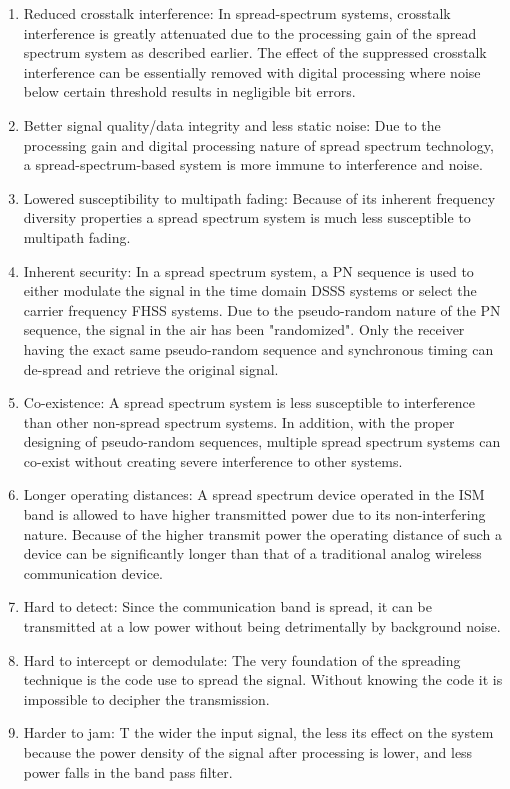 \documentclass[12pt, a4paper,twoside]{tesi_upf}
\begin{document}
\begin{enumerate}
	\item Reduced crosstalk interference: In spread-spectrum systems, crosstalk interference is greatly attenuated due to the processing gain of the spread spectrum system as described earlier. The effect of the suppressed crosstalk interference can be essentially removed with digital processing where noise below certain threshold results in negligible bit errors.
	\item Better signal quality/data integrity and less static noise: Due to the processing gain and digital processing nature of spread spectrum technology, a spread-spectrum-based system is more immune to interference and noise.
	\item Lowered susceptibility to multipath fading: Because of its inherent frequency diversity properties a spread spectrum system is much less susceptible to multipath fading.
	\item Inherent security: In a spread spectrum system, a PN sequence is used to either modulate the signal in the time domain DSSS systems or select the carrier frequency FHSS systems. Due to the pseudo-random nature of the PN sequence, the signal in the air has been "randomized". Only the receiver having the exact same pseudo-random sequence and synchronous timing can de-spread and retrieve the original signal.
	\item Co-existence: A spread spectrum system is less susceptible to interference than other non-spread spectrum systems. In addition, with the proper designing of pseudo-random sequences, multiple spread spectrum systems can co-exist without creating severe interference to other systems.
	\item Longer operating distances: A spread spectrum device operated in the ISM band is allowed to have higher transmitted power due to its non-interfering nature. Because of the higher transmit power the operating distance of such a device can be significantly longer than that of a traditional analog wireless communication device.
	\item Hard to detect: Since the communication band is spread, it can be transmitted at a low power without being detrimentally by background noise.
	\item Hard to intercept or demodulate: The very foundation of the spreading technique is the code use to spread the signal. Without knowing the code it is impossible to decipher the transmission.
	\item Harder to jam: T the wider the input signal, the less its effect on the system because the power density of the signal after processing is lower, and less power falls in the band pass filter.
\end{enumerate}
\end{document}
